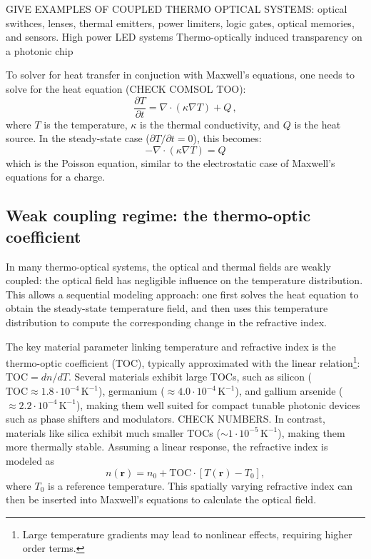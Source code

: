 GIVE EXAMPLES OF COUPLED THERMO OPTICAL SYSTEMS: optical swithces, lenses, thermal emitters,
power limiters, logic gates, optical memories, and sensors.
High power LED systems
Thermo-optically induced transparency on a photonic chip


To solver for heat transfer in conjuction with Maxwell's equations, one needs to solve for the heat equation (CHECK COMSOL TOO):
\begin{equation}
    \frac{\partial T}{\partial t} = \nabla \cdot (\kappa \nabla T) + Q\,,
\end{equation}
where $T$ is the temperature, $\kappa$ is the thermal conductivity, and $Q$ is the heat source.
In the steady-state case ($\partial T / \partial t = 0$), this becomes:
\begin{equation}
    -\nabla \cdot (\kappa \nabla T) = Q
\end{equation}
which is the Poisson equation, similar to the electrostatic case of Maxwell's equations for a charge.

\subsection*{Weak coupling regime: the thermo-optic coefficient}

In many thermo-optical systems, the optical and thermal fields are weakly coupled: the optical field has negligible influence on the temperature distribution. 
This allows a sequential modeling approach: one first solves the heat equation to obtain the steady-state temperature field, and then uses this temperature distribution to compute the corresponding change in the refractive index. 

The key material parameter linking temperature and refractive index is the thermo-optic coefficient (TOC), typically approximated with the linear relation\footnote{Large temperature gradients may lead to nonlinear effects, requiring higher order terms.}: $\text{TOC} = dn/dT$. 
Several materials exhibit large TOCs, such as silicon ($\text{TOC} \approx 1.8 \cdot 10^{-4}\, \text{K}^{-1}$), germanium ($\approx 4.0 \cdot 10^{-4}\, \text{K}^{-1}$), and gallium arsenide ($\approx 2.2 \cdot 10^{-4}\, \text{K}^{-1}$), making them well suited for compact tunable photonic devices such as phase shifters and modulators. CHECK NUMBERS. In contrast, materials like silica exhibit much smaller TOCs ($\sim 1 \cdot 10^{-5}\, \text{K}^{-1}$), making them more thermally stable. 
Assuming a linear response, the refractive index is modeled as
\begin{equation}
n(\mathbf{r}) = n_0 + \text{TOC} \cdot \left[T(\mathbf{r}) - T_0\right],
\end{equation}
where $T_0$ is a reference temperature. This spatially varying refractive index can then be inserted into Maxwell’s equations to calculate the optical field. 

